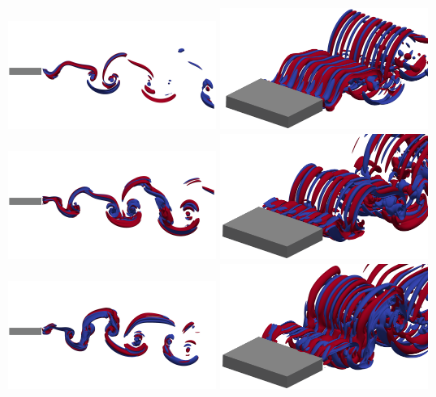 \begin{figure}
  \centering
  \includegraphics[trim={0 250 0 200},clip,width=0.49\textwidth]{./fig/AR4p5/omegax_Re425_2D.png}
  \includegraphics[trim={10 0 10 0},clip,width=0.49\textwidth]{./fig/AR4p5/omegax_Re425_3D.png} 
  \includegraphics[trim={0 250 0 200},clip,width=0.49\textwidth]{./fig/AR4p5/omegax_Re450_2D.png}
  \includegraphics[trim={10 0 10 0},clip,width=0.49\textwidth]{./fig/AR4p5/omegax_Re450_3D.png} 
  \includegraphics[trim={0 250 0 200},clip,width=0.49\textwidth]{./fig/AR4p5/omegax_Re475_2D.png}
  \includegraphics[trim={10 0 10 0},clip,width=0.49\textwidth]{./fig/AR4p5/omegax_Re475_3D.png} 

\end{figure}
